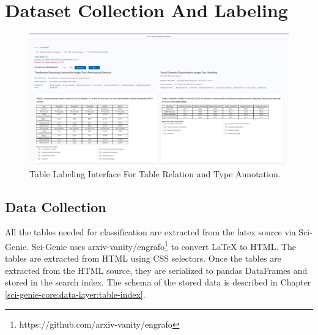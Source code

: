 \section{Dataset Collection And Labeling}
\label{table_classification:data-coll}

\begin{figure}[h]
    \centering
    \includegraphics[width=\maxwidth{\textwidth}]{src/images/table-lable-exp.pdf}
    \caption{Table Labeling Interface For Table Relation and Type Annotation. }
    \label{figure\arabic{figurecounter}}
\end{figure}

\subsection{Data Collection}
\label{table_classification:data-coll:coll}
All the tables needed for classification are extracted from the latex source via Sci-Genie. Sci-Genie uses arxiv-vanity/engrafo\footnote{https://github.com/arxiv-vanity/engrafo} to convert LaTeX to HTML. The tables are extracted from HTML  using CSS selectors. Once the tables are extracted from the HTML source, they are serialized to pandas DataFrames and stored in the search index. The schema of the stored data is described in Chapter \ref{sci-genie-core:data-layer:table-index}. 

